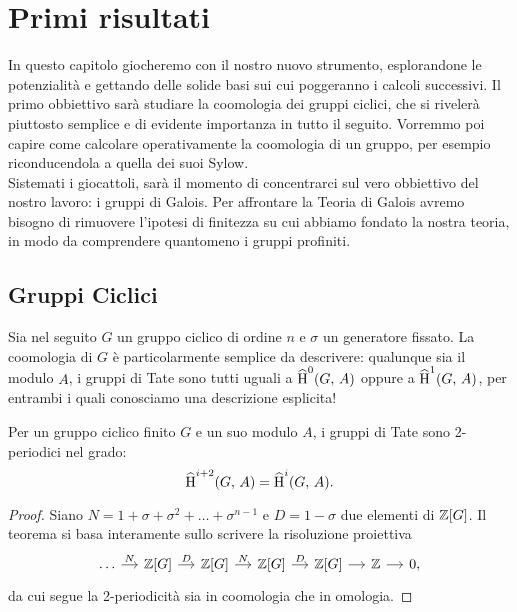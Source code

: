 \chapter{Primi risultati}
In questo capitolo giocheremo con il nostro nuovo strumento, esplorandone le potenzialità e gettando delle solide basi sui cui poggeranno i calcoli successivi. Il primo obbiettivo sarà studiare la coomologia dei gruppi ciclici, che si rivelerà piuttosto semplice e di evidente importanza in tutto il seguito. Vorremmo poi capire come calcolare operativamente la coomologia di un gruppo, per esempio riconducendola a quella dei suoi Sylow. \\

Sistemati i giocattoli, sarà il momento di concentrarci sul vero obbiettivo del nostro lavoro: i gruppi di Galois. Per affrontare la Teoria di Galois avremo bisogno di rimuovere l'ipotesi di finitezza su cui abbiamo fondato la nostra teoria, in modo da comprendere quantomeno i gruppi profiniti.

\section{Gruppi Ciclici}
Sia nel seguito $ G $ un gruppo ciclico di ordine $ n $ e $ \sigma $ un generatore fissato. La coomologia di $ G $ è particolarmente semplice da descrivere: qualunque sia il modulo $ A $, i gruppi di Tate sono tutti uguali a $ \operatorname{\widehat{H}}^0(G, \, A) $ oppure a $ \operatorname{\widehat{H}}^1(G, \, A) $, per entrambi i quali conosciamo una descrizione esplicita! 

\begin{theorem}\label{ciclici}
	Per un gruppo ciclico finito $ G $ e un suo modulo $ A $, i gruppi di Tate sono 2-periodici nel grado:
	\[ \operatorname{\widehat{H}}^{i+2}(G, \, A) = \operatorname{\widehat{H}}^{i}(G, \, A). \]
\end{theorem}

\begin{proof}
	Siano $ N = 1 + \sigma + \sigma^2 + \dots + \sigma^{n-1} $ e $ D = 1 - \sigma $ due elementi di $ \mathbb{Z}[G] $. Il teorema si basa interamente sullo scrivere la risoluzione proiettiva
	\[ \begin{tikzcd}[column sep = small]
	\dots \rar["N"]
	& \Z[G] \rar["D"]
	& \Z[G] \rar["N"]
	& \Z[G] \rar["D"]
	& \Z[G] \rar
	& \Z \rar & 0,
	\end{tikzcd} \]
	da cui segue la 2-periodicità sia in coomologia che in omologia. 
	
\end{proof}

